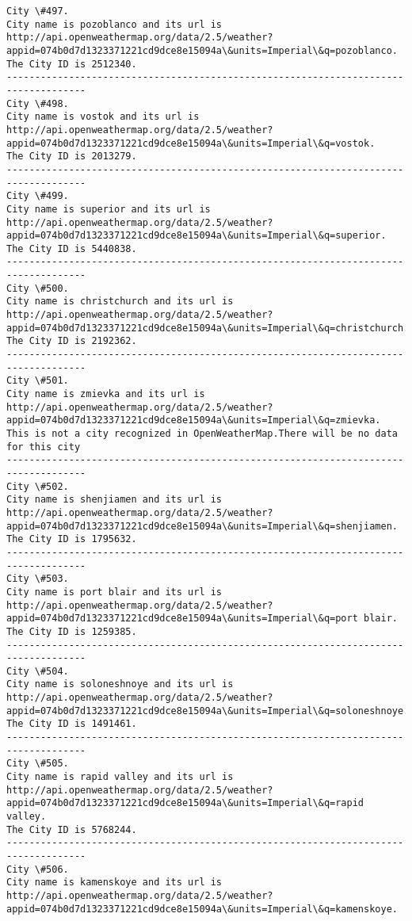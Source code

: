 \documentclass[11pt]{article}
\begin{document}
\begin{Verbatim}[commandchars=\\\{\}]
City \#497.
City name is pozoblanco and its url is http://api.openweathermap.org/data/2.5/weather?appid=074b0d7d1323371221cd9dce8e15094a\&units=Imperial\&q=pozoblanco.
The City ID is 2512340.
------------------------------------------------------------------------------------
City \#498.
City name is vostok and its url is http://api.openweathermap.org/data/2.5/weather?appid=074b0d7d1323371221cd9dce8e15094a\&units=Imperial\&q=vostok.
The City ID is 2013279.
------------------------------------------------------------------------------------
City \#499.
City name is superior and its url is http://api.openweathermap.org/data/2.5/weather?appid=074b0d7d1323371221cd9dce8e15094a\&units=Imperial\&q=superior.
The City ID is 5440838.
------------------------------------------------------------------------------------
City \#500.
City name is christchurch and its url is http://api.openweathermap.org/data/2.5/weather?appid=074b0d7d1323371221cd9dce8e15094a\&units=Imperial\&q=christchurch.
The City ID is 2192362.
------------------------------------------------------------------------------------
City \#501.
City name is zmievka and its url is http://api.openweathermap.org/data/2.5/weather?appid=074b0d7d1323371221cd9dce8e15094a\&units=Imperial\&q=zmievka.
This is not a city recognized in OpenWeatherMap.There will be no data for this city
------------------------------------------------------------------------------------
City \#502.
City name is shenjiamen and its url is http://api.openweathermap.org/data/2.5/weather?appid=074b0d7d1323371221cd9dce8e15094a\&units=Imperial\&q=shenjiamen.
The City ID is 1795632.
------------------------------------------------------------------------------------
City \#503.
City name is port blair and its url is http://api.openweathermap.org/data/2.5/weather?appid=074b0d7d1323371221cd9dce8e15094a\&units=Imperial\&q=port blair.
The City ID is 1259385.
------------------------------------------------------------------------------------
City \#504.
City name is soloneshnoye and its url is http://api.openweathermap.org/data/2.5/weather?appid=074b0d7d1323371221cd9dce8e15094a\&units=Imperial\&q=soloneshnoye.
The City ID is 1491461.
------------------------------------------------------------------------------------
City \#505.
City name is rapid valley and its url is http://api.openweathermap.org/data/2.5/weather?appid=074b0d7d1323371221cd9dce8e15094a\&units=Imperial\&q=rapid valley.
The City ID is 5768244.
------------------------------------------------------------------------------------
City \#506.
City name is kamenskoye and its url is http://api.openweathermap.org/data/2.5/weather?appid=074b0d7d1323371221cd9dce8e15094a\&units=Imperial\&q=kamenskoye.

\end{Verbatim}
\end{document}
